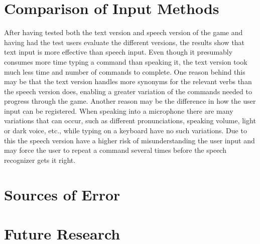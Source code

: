 \section{Comparison of Input Methods} %
After having tested both the text version and speech version of the game and having had the test users evaluate the different versions, the results show that text input is more effective than speech input. Even though it presumably consumes more time typing a command than speaking it, the text version took much less time and number of commands to complete. One reason behind this may be that the text version handles more synonyms for the relevant verbs than the speech version does, enabling a greater variation of the commands needed to progress through the game. Another reason may be the difference in how the user input can be registered. When speaking into a microphone there are many variations that can occur, such as different pronunciations, speaking volume, light or dark voice, etc., while typing on a keyboard have no such variations. Due to this the speech version have a higher risk of misunderstanding the user input and may force the user to repeat a command several times before the speech recognizer gets it right.

\section{Sources of Error} %


\section{Future Research}